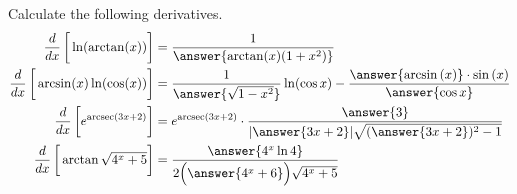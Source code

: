\documentclass{ximera}
\author{Nela Lakos}
\begin{document}
\begin{exercise}

Calculate the following derivatives.
\begin{align*}
\frac{d}{dx}\left[\vphantom{\frac{d}{dx}}\ln(\arctan(x))\right] &= \frac{1}{\answer{\arctan(x)(1+x^2)}}\\
\frac{d}{dx}\left[\vphantom{\frac{d}{dx}}\arcsin(x)\ln(\cos(x))\right] &=\dfrac{1}{ \answer{\sqrt{1-x^2}}}\ln(\cos{x}) - \dfrac{\answer{\arcsin{(x)}}\cdot\sin{(x)}}{\answer{\cos{x}}}\\
\frac{d}{dx}\left[\vphantom{\frac{d}{dx}}e^{\text{arcsec}{\left(3x+2\right)}}\right] &=e^{\text{arcsec}(3x+2)}\cdot\dfrac{\answer{3}}{|\answer{3x+2}|\sqrt{(\answer{3x+2})^2-1}}\\
\frac{d}{dx}\left[\vphantom{\frac{d}{dx}}\arctan{\sqrt{4^x +5}}\right] &=\dfrac{\answer{4^{x}\ln{4}}}{2\Bigl(\answer{4^{x}+6}\Bigr)\sqrt{4^{x}+5}}
\end{align*}
\end{exercise}
\end{document}
